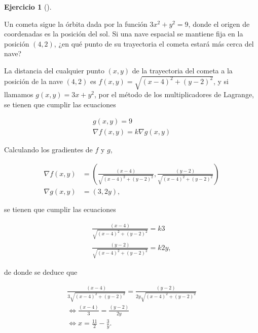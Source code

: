 \documentclass[
  spanish,
  a4paper,
]{scrreport}
\theoremstyle{definition}
\newtheorem{exercise}{Ejercicio}[chapter]
\theoremstyle{remark}
\begin{document}
\begin{exercise}[]\protect\hypertarget{exr-minimización-distancia-parabola}{}\label{exr-minimización-distancia-parabola}

Un cometa sigue la órbita dada por la función \(3x^2+y^2=9\), donde el
origen de coordenadas es la posición del sol. Si una nave espacial se
mantiene fija en la posición \((4,2)\), ¿en qué punto de su trayectoria
el cometa estará más cerca del nave?

\end{exercise}

\begin{tcolorbox}[enhanced jigsaw, arc=.35mm, bottomrule=.15mm, bottomtitle=1mm, breakable, colback=white, colbacktitle=quarto-callout-tip-color!10!white, colframe=quarto-callout-tip-color-frame, coltitle=black, left=2mm, leftrule=.75mm, opacityback=0, opacitybacktitle=0.6, rightrule=.15mm, title=\textcolor{quarto-callout-tip-color}{\faLightbulb}\hspace{0.5em}{Solución}, titlerule=0mm, toprule=.15mm, toptitle=1mm]

La distancia del cualquier punto \((x, y)\) de la trayectoria del cometa
a la posición de la nave \((4,2)\) es
\(f(x, y) = \sqrt{(x-4)^2+(y-2)^2}\), y si llamamos \(g(x,y)=3x+y^2\),
por el método de los multiplicadores de Lagrange, se tienen que cumplir
las ecuaciones

\[
\begin{gathered}
g(x,y) = 9\\
\nabla f(x,y) = k\nabla g(x,y)
\end{gathered}
\]

Calculando los gradientes de \(f\) y \(g\),

\begin{align*}
\nabla f(x,y) &= \left(\frac{(x-4)}{\sqrt{(x-4)^2+(y-2)^2}}, \frac{(y-2)}{\sqrt{(x-4)^2+(y-2)^2}}\right) \\
\nabla g(x,y) &= (3, 2y),
\end{align*}

se tienen que cumplir las ecuaciones

\[
\begin{gathered}
\frac{(x-4)}{\sqrt{(x-4)^2+(y-2)^2}} = k3 \\
\frac{(y-2)}{\sqrt{(x-4)^2+(y-2)^2}} = k2y,
\end{gathered}
\]

de donde se deduce que

\[
\begin{gathered}
\frac{(x-4)}{3\sqrt{(x-4)^2+(y-2)^2}} = \frac{(y-2)}{2y\sqrt{(x-4)^2+(y-2)^2}} \\
\Leftrightarrow \frac{(x-4)}{3} = \frac{(y-2)}{2y} \\
\Leftrightarrow x = \frac{11}{2}-\frac{3}{y}.
\end{gathered}
\]


\end{tcolorbox}
\end{document}
